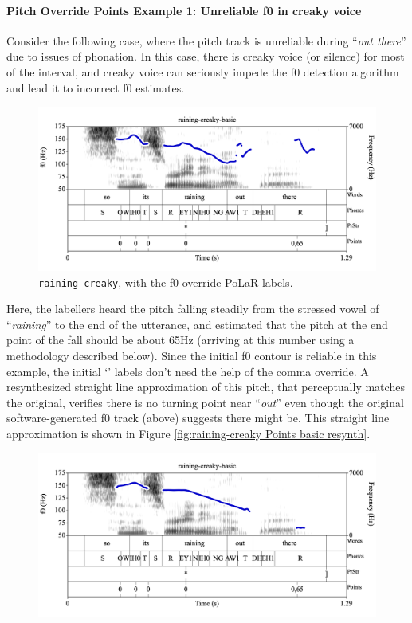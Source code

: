 \documentclass[11pt, twoside]{memoir}
\def\textlabel#1{{\relsize{-.5}\fontspec[Mapping=tex-text]{Roboto Mono}{#1}}}
\def\langtext#1{\textit{#1}}
\begin{document}
{{\paragraph{Pitch Override Points Example 1: Unreliable f0 in creaky voice\label{pitch-override-points-example-1}}
Consider the following case, where the pitch track is unreliable during “\langtext{out there}” due to issues of phonation. In this case, there is creaky voice (or silence) for most of the interval, and creaky voice can seriously impede the f0 detection algorithm and lead it to incorrect f0 estimates.
\begin{figure}[H]
\centering
\includegraphics[width=.875\linewidth]{Points-raining-creaky-basic-comma.png}
\caption{\texttt{raining-creaky}, with the f0 override PoLaR labels.
\label{fig:raining-creaky Points comma}
}
\end{figure}
Here, the labellers heard the pitch falling steadily from the stressed vowel of “\langtext{raining}” to the end of the utterance, and estimated that the pitch at the end point of the fall should be about 65Hz (arriving at this number using a methodology described below). Since the initial f0 contour is reliable in this example, the initial ‘\textlabel{0}’ labels don’t need the help of the comma override. A resynthesized straight line approximation of this pitch, that perceptually matches the original, verifies there is no turning point near “\langtext{out}” even though the original software-generated f0 track (above) suggests there might be. This straight line approximation is shown in Figure \ref{fig:raining-creaky Points basic resynth}.
\begin{figure}[H]
\centering
\includegraphics[width=.875\linewidth]{Points-raining-creaky-resynth-basic.png}

\end{figure}}}
\end{document}

